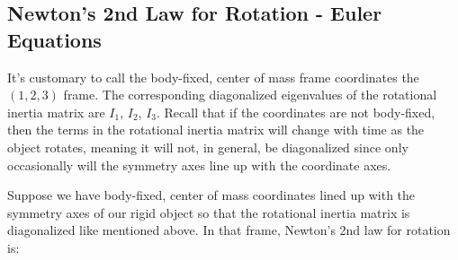 \documentclass[10pt]{article}
\begin{document}
\subsection{Newton's 2nd Law for Rotation - Euler Equations}

It's customary to call the body-fixed, center of mass 
frame coordinates the $(1,2,3)$ frame. The corresponding diagonalized 
eigenvalues of the rotational inertia matrix are $I_1$, $I_2$, $I_3$.
Recall that if the coordinates are not body-fixed, then the terms in 
the rotational inertia matrix will change with time as the object rotates, 
meaning it will not, in general, be diagonalized since only occasionally will 
the symmetry axes line up with the coordinate axes.

Suppose we have body-fixed, center of mass coordinates lined up with the 
symmetry axes of our rigid object so that the rotational inertia matrix is 
diagonalized like mentioned above. In that frame, Newton's 2nd law for 
rotation is:
\end{document}

